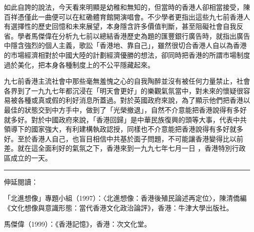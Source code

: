 
如此自誇的說法，今天看來明顯是幼稚和無知的，但當時的香港人卻相當接受，陳百祥憑僅此一曲便可以在紅磡體育館開演唱會。不少學者更指出這些九七前香港人有選擇性的歷史回憶和未來展望，本身隱含許多價值判斷，甚至阻礙社會自我反省。學者馬傑偉在分析九七前以總結香港歷史為題的匯豐銀行廣告時，就指出廣告中隱含強烈的個人主義，歌訟「香港地、靠自己」，雖然很切合香港人自以為香港的市場經濟相對於中國大陸的計劃經濟優勝的想法，卻同時把香港的所謂市場制度過於美化，把本身各種制度上的不公平隱藏起來。

九七前香港主流社會中那些毫無羞愧之心的自我陶醉並沒有被任何力量禁止，社會各界到了一九九七年都沉浸在「明天會更好」的樂觀氣氛當中，對未來的懷疑很容易被各種或真或假的利好消息所蓋過。對於英國政府來說，為了顯示他們把香港以最佳的狀態交到中方手中，做到了「光榮撤退」，自然不介意能把香港說得有多好就多好。對於中國政府來說，「香港回歸」是中華民族復興的頭等大事，代表中共領導下的國家強大，有利建構執政認授，同樣也不介意能把香港說得有多好就多好。至於香港人自己，也盲目相信中共基於面子問題，不可能讓香港變得比以前差。就在這全面利好的氣氛之下，香港來到一九九七年七月一日 ，香港特別行政區成立的一天。

\rule[-10pt]{15cm}{0.05em}

伸延閱讀：

「北進想像」專題小組（1997）：〈北進想像：香港後殖民論述再定位〉，陳清僑編《文化想像與意識形態：當代香港文化政治論評》，香港：牛津大學出版社。

馬傑偉（1999）：《香港記憶》，香港：次文化堂。